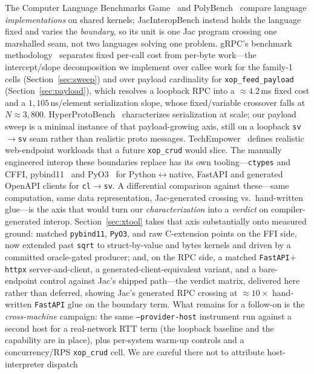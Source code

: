 \documentclass[conference]{IEEEtran}
\newcommand{\code}[1]{\texttt{#1}}
\begin{document}
The Computer Language Benchmarks Game~\cite{clbg} and PolyBench~\cite{polybench}
compare language \emph{implementations} on shared kernels; JacInteropBench instead
holds the language fixed and varies the \emph{boundary}, so its unit is one Jac
program crossing one marshalled seam, not two languages solving one problem.
gRPC's benchmark methodology~\cite{grpc} separates fixed per-call cost from
per-byte work---the intercept/slope decomposition we implement over callee work
for the family-1 cells (Section~\ref{sec:sweep}) and over payload cardinality for
\code{xop\_feed\_payload} (Section~\ref{sec:payload}), which resolves a loopback
RPC into a $\approx$$4.2$\,ms fixed cost and a $1{,}105$\,ns/element serialization
slope, whose fixed/variable crossover falls at $N\approx3{,}800$. HyperProtoBench~\cite{hyperproto} characterizes serialization at scale;
our payload sweep is a minimal instance of that payload-growing axis, still on a
loopback \code{sv$\rightarrow$sv} seam rather than realistic proto messages. TechEmpower~\cite{techempower} defines realistic web-endpoint
workloads that a future \code{xop\_crud} would slice. The manually engineered interop these boundaries replace has its own
tooling---\code{ctypes} and CFFI, pybind11~\cite{pybind11} and
PyO3~\cite{pyo3} for Python$\leftrightarrow$native, FastAPI and generated
OpenAPI clients for \code{cl}$\rightarrow$\code{sv}. A differential comparison
against these---same computation, same data representation, Jac-generated
crossing vs.\ hand-written glue---is the axis that would turn our
\emph{characterization} into a \emph{verdict} on compiler-generated interop.
Section~\ref{sec:xtool} takes that axis substantially onto measured ground:
matched \code{pybind11}, \code{PyO3}, and raw C-extension points on the FFI side,
now extended past \code{sqrt} to struct-by-value and bytes kernels and driven by
a committed oracle-gated producer; and, on the RPC side, a matched
\code{FastAPI}$+$\code{httpx} server-and-client, a generated-client-equivalent
variant, and a bare-endpoint control against Jac's shipped path---the verdict
matrix, delivered here rather than deferred, showing Jac's generated RPC crossing
at $\approx$$10\times$ hand-written \code{FastAPI} glue on the boundary term. What
remains for a follow-on is the \emph{cross-machine} campaign: the same
\code{--provider-host} instrument run against a second host for a real-network
RTT term (the loopback baseline and the capability are in place), plus
per-system warm-up controls and a concurrency/RPS \code{xop\_crud} cell. We are careful there not to attribute host-interpreter dispatch
\end{document}
